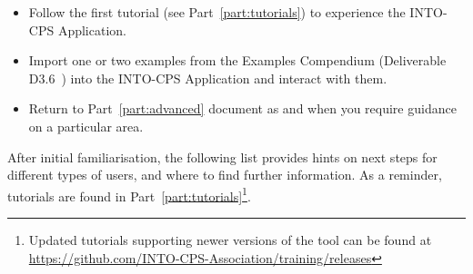 \begin{itemize}[noitemsep]
  \item Follow the first tutorial (see Part~\ref{part:tutorials}) to experience the INTO-CPS Application.
  \item Import one or two examples from the Examples Compendium (Deliverable D3.6~\cite{INTOCPSD3.6}) into the INTO-CPS Application and interact with them.
  \item Return to Part~\ref{part:advanced} document as and when you require guidance on a particular area.
\end{itemize}

After initial familiarisation, the following list provides hints on next steps for different types of users, and where to find further information. As a reminder, tutorials are found in Part~\ref{part:tutorials}\footnote{Updated tutorials supporting newer versions of the tool can be found at \url{https://github.com/INTO-CPS-Association/training/releases}}.


